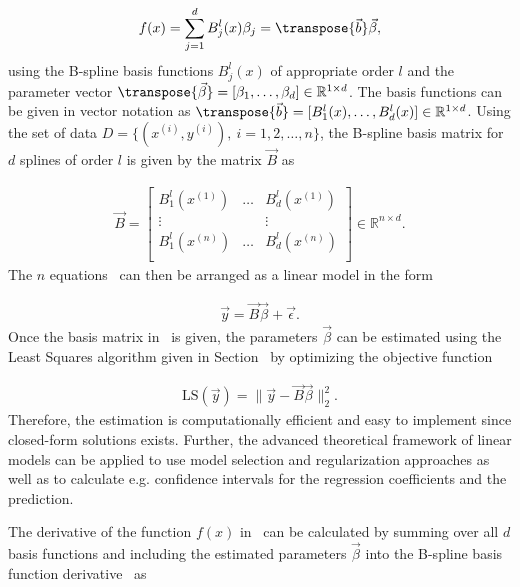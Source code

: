 \begin{align} \label{eq:bspline-bf-approach}
	f(x) = \sum_{j=1}^d B_j^l(x) \beta_j = \transpose{\vec{b}} \vec{\beta},
\end{align}
%
using the B-spline basis functions $B_j^l(x)$ of appropriate order $l$ and the parameter vector $\transpose{\vec{\beta}} = [\beta_1, \dots, \beta_d] \in \mathbb{R}^{1 \times d}$. The basis functions can be given in vector notation as $\transpose{\vec{b}} = [B_1^l(x), \dots, B_d^l(x)] \in \mathbb{R}^{1 \times d}$. Using the set of data $D = \{ (x^{(i)}, y^{(i)}), \ i=1,2, \dots, n \}$, the B-spline basis matrix for $d$ splines of order $l$ is given by the matrix $\vec{B}$ as

\begin{align} \label{eq:bspline-basis-matrix}
	\vec{B} = \begin{bmatrix}
				B_1^l(x^{(1)}) & \dots & B_d^l(x^{(1)})  \\
				\vdots         &       & \vdots 		 \\
				B_1^l(x^{(n)}) & \dots & B_d^l(x^{(n)})  \\
	\end{bmatrix} \in \mathbb{R}^{n \times d}.
\end{align}
%
The $n$ equations~ can then be arranged as a linear model in the form

\begin{align} \label{eq:Bspline-linModel}
	\vec{y} = \vec{B} \vec{\beta} + \vec{\epsilon}.
\end{align}
%
Once the basis matrix in~ is given, the parameters $\vec{\beta}$ can be estimated using the Least Squares algorithm given in Section~ by optimizing the objective function

\begin{align} \label{eq:Bspline-OF}
	\text{LS}(\vec{y}) = \lVert \vec{y} - \vec{B} \vec{\beta} \rVert_2^2.	
\end{align}
%
Therefore, the estimation is computationally efficient and easy to implement since closed-form solutions exists. Further, the advanced theoretical framework of linear models can be applied to use model selection and regularization approaches as well as to calculate e.g. confidence intervals for the regression coefficients and the prediction.

The derivative of the function $f(x)$ in~ can be calculated by summing over all $d$ basis functions and including the estimated parameters $\vec{\beta}$ into the B-spline basis function derivative~ as

